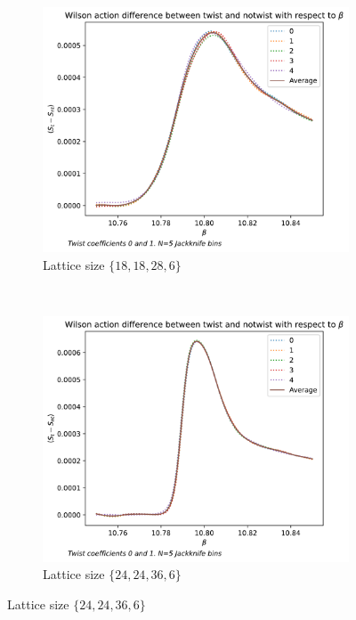 \documentclass[english,twoside,openright]{UH_TCM_MSc}
\begin{document}
\begin{figure}[htpb]
    \centering
    \begin{subfigure}[t]{0.5\textwidth}
        \centering
        \includegraphics[width=\textwidth]{final_plots/18_18_28/action_diff_0-1.pdf}
        \caption{Lattice size $\{18,18,28,6\}$}
    \end{subfigure}%
    ~ 
    \begin{subfigure}[t]{0.5\textwidth}
        \centering
        \includegraphics[width=\textwidth]{final_plots/24_24_36_highlight/action_diff_0-1.pdf}
        \caption{Lattice size $\{24,24,36,6\}$}
    \end{subfigure}

\end{figure}
\end{document}
